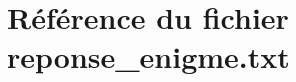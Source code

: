 \hypertarget{reponse__enigme_8txt}{}\section{Référence du fichier reponse\+\_\+enigme.\+txt}
\label{reponse__enigme_8txt}
